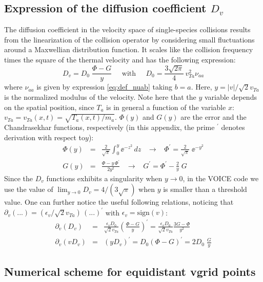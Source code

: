 \documentclass[11pt]{article}
\begin{document}
\subsection{Expression of the diffusion coefficient $D_v$}
\label{appendix:Dv}
The diffusion coefficient in the velocity space of single-species collisions results from the linearization of the collision operator by considering small fluctuations around a Maxwellian distribution function. It scales like the collision frequency times the square of the thermal velocity and has the following expression:
%
\begin{equation} \label{eq:def_Dv}
D_v = D_0 \; \frac{\Phi - G}{y}
\;\;\;\;\; \textrm{with} \;\;\;\;\;
D_0 = \frac{3\sqrt{2\pi}}{4}\, v_{Ta}^2\nu_{aa}
\end{equation}
%
where $\nu_{aa}$ is given by expression \eqref{eq:def_nuab} taking $b=a$. Here, $y = |v|/\sqrt{2}v_{Ta}$ is the normalized modulus of the velocity. Note here that the $y$ variable depends on the spatial position, since $T_a$ is in general a function of the variable $x$: $v_{Ta} = v_{Ta}(x,t) = \sqrt{T_a(x,t)/m_a}$. $\Phi(y)$ and $G(y)$ are the error and the Chandrasekhar functions, respectively (in this appendix, the prime $^\prime$ denotes derivation with respect to$y$):
%
\begin{eqnarray}
\label{eq:def_Phi}
\Phi(y) &=& \frac{2}{\sqrt{\pi}} \int_0^{y} \ee^{-z^2}\,d z 
\;\;\; \to \;\;\;
\Phi^\prime = \frac{2}{\sqrt{\pi}}\; \ee^{-y^2} 
\\
\label{eq:def_G}
G(y)    &=& \frac{\Phi - y\, \Phi^\prime}{2y^2}
\;\;\; \to \;\;\;
G^\prime = \Phi^\prime - \frac{2}{y}\; G 
\end{eqnarray}
%
Since the $D_v$ functions exhibits a singularity when $y \to  0$, in the VOICE code we use the value of $\lim_{y \to 0} D_v   = 4/(3\sqrt{\pi } )$ when $y$ is smaller than a threshold value. One can further notice the useful following relations, noticing that $\partial_v(...) = (\epsilon_v/\sqrt{2}v_{Ta}) \, (...)^\prime$ with $\epsilon_v = \textrm{sign}(v)$:
%
\begin{eqnarray}
\partial_v(D_v) &=& \frac{\epsilon_v D_0}{\sqrt{2}v_{Ta}} 
\left( \frac{\Phi - G}{y}\right)^\prime 
= \frac{\epsilon_v D_0}{\sqrt{2}v_{Ta}} \frac{3G-\Phi}{y^2}
\\
\partial_v(vD_v) &=& (yD_v)^\prime
= D_0 (\Phi-G)^\prime = 2D_0 \; \frac{G}{y}
\end{eqnarray}
%

\subsection{Numerical scheme for equidistant vgrid points}
\label{sec:numerical_scheme_for_equidistant_vgrid_points}
\end{document}
